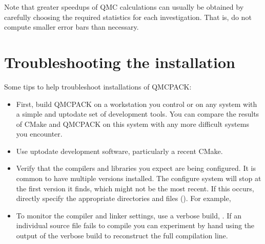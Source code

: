 \documentclass[letterpaper,10pt,english]{sphinxmanual}
\begin{document}
Note that greater speedups of QMC calculations can usually be obtained by
carefully choosing the required statistics for each
investigation. That is, do not compute smaller error bars than necessary.


\section{Troubleshooting the installation}
\label{\detokenize{installation:troubleshooting-the-installation}}\label{\detokenize{installation:troubleshoot}}
Some tips to help troubleshoot installations of QMCPACK:
\begin{itemize}
\item {} 
First, build QMCPACK on a workstation you control or on any
system with a simple and up\sphinxhyphen{}to\sphinxhyphen{}date set of development
tools. You can compare the results of CMake and QMCPACK on this
system with any more difficult systems you encounter.

\item {} 
Use up\sphinxhyphen{}to\sphinxhyphen{}date development software, particularly a recent
CMake.

\item {} 
Verify that the compilers and libraries you expect are
being configured. It is common to have multiple versions
installed. The configure system will stop at the first version it
finds, which might not be the most recent. If this occurs, directly specify the appropriate
directories and files ({\hyperref[\detokenize{installation:cmakeoptions}]{}}). For example,

\begin{sphinxVerbatim}[commandchars=\\\{\}]
   
\end{sphinxVerbatim}

\item {} 
To monitor the compiler and linker settings, use a verbose build, . If an individual source file fails to compile you
can experiment by hand using the output of the verbose build to
reconstruct the full compilation line.

\end{itemize}
\end{document}
